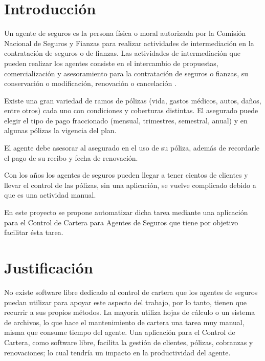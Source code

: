 

\setcounter{page}{1}
\section{Introducción}%
Un agente de seguros es la persona física o moral autorizada por la Comisión Nacional de Seguros y Fianzas para realizar actividades de intermediación en la contratación de seguros o de fianzas. Las actividades de intermediación que pueden realizar los agentes consiste en el intercambio de propuestas, comercialización y asesoramiento para la contratación de seguros o fianzas, su conservación o modificación, renovación o cancelación \cite{www:reg-agentes}.

Existe una gran variedad de ramos de pólizas (vida, gastos médicos, autos, daños, entre otros) cada uno con condiciones y coberturas distintas. El asegurado puede elegir el tipo de pago fraccionado (mensual, trimestres, semestral, anual) y en algunas pólizas la vigencia del plan.

El agente debe asesorar al asegurado en el uso de su póliza, además de recordarle el pago de su recibo y fecha de renovación.

Con los años los agentes de seguros pueden llegar a tener cientos de clientes y llevar el control de las pólizas, sin una aplicación, se vuelve complicado debido a que es una actividad manual.

En este proyecto se propone automatizar dicha tarea mediante una aplicaci\'on para el Control de Cartera para Agentes de Seguros que tiene por objetivo facilitar \'esta tarea.

\section{Justificación}

No existe software libre dedicado al control de cartera que los agentes de seguros puedan utilizar para apoyar este aspecto del trabajo, por lo tanto, tienen que recurrir a sus propios métodos. La mayoría utiliza hojas de cálculo o un sistema de archivos, lo que hace el mantenimiento de cartera una tarea muy manual, misma que consume tiempo del agente.
Una aplicación para el Control de Cartera, como software libre, facilita la gestión de clientes, pólizas, cobranzas y renovaciones; lo cual tendría un impacto en la productividad del agente.

